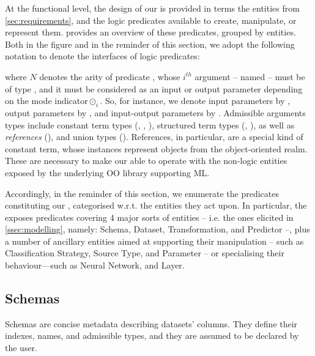 \documentclass[12pt,a4paper,openright,twoside]{book}
\begin{document}
At the functional level, the design of our \mllib{} is provided in terms the entities from \cref{sec:requirements}, and the logic predicates available to create, manipulate, or represent them.
%
 provides an overview of these predicates, grouped by entities.
%
Both in the figure and in the reminder of this section, we adopt the following notation to denote the interfaces of logic predicates:
%
\begin{center}
\end{center}
%
where $N$ denotes the arity of predicate , whose $i^{th}$ argument -- named  -- must be of type , and it must be considered as an input or output parameter depending on the mode indicator\footnotemark $\odot_i$.
%
%
So, for instance, we denote input parameters by \pl{+}, output parameters by \pl{-}, and input-output parameters by .
%
Admissible arguments types include constant term types (, , ), structured term types (, ), as well as \emph{references} (), and union types ().
%
References, in particular, are a special kind of constant term, whose instances represent objects from the object-oriented realm.
%
These are necessary to make our \mllib{} able to operate with the non-logic entities exposed by the underlying OO library supporting ML.

Accordingly, in the reminder of this section, we enumerate the predicates constituting our \mllib{}, categorised w.r.t. the entities they act upon.
%
In particular, the \mllib{} exposes predicates covering 4 major sorts of entities -- i.e. the ones elicited in \cref{ssec:modelling}, namely: Schema, Dataset, Transformation, and Predictor --, plus a number of ancillary entities aimed at supporting their manipulation -- such as Classification Strategy, Source Type, and Parameter -- or specialising their behaviour---such as Neural Network, and Layer.

\subsection{Schemas}
\label{ssec:schemas}

Schemas are concise metadata describing datasets' columns.
%
They define their indexes, names, and admissible types, and they are assumed to be declared by the user.
\end{document}
